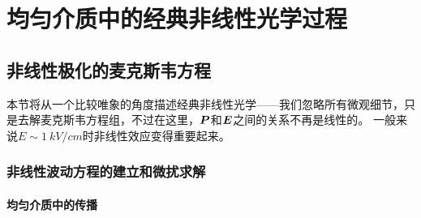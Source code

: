 \chapter{均匀介质中的经典非线性光学过程}

\section{非线性极化的麦克斯韦方程}\label{sec:non-linear-maxwell}

本节将从一个比较唯象的角度描述经典非线性光学——我们忽略所有微观细节，只是去解麦克斯韦方程组，不过在这里，$\vb*{P}$和$\vb*{E}$之间的关系不再是线性的。
一般来说$E \sim \SI{1}{kV/cm}$时非线性效应变得重要起来。

\subsection{非线性波动方程的建立和微扰求解}

\subsubsection{均匀介质中的传播}

